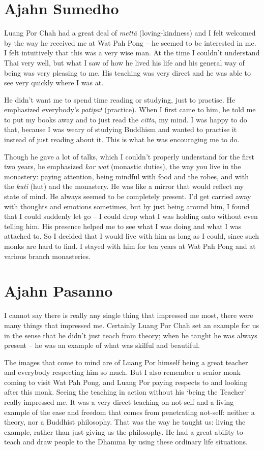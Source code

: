 
\section{Ajahn Sumedho}

Luang Por Chah had a great deal of \emph{mettā} (loving-kindness) and I
felt welcomed by the way he received me at Wat Pah Pong -- he seemed to
be interested in me. I felt intuitively that this was a very wise man. 
At the time I couldn't understand Thai very well, but what I saw of how
he lived his life and his general way of being was very pleasing to me. 
His teaching was very direct and he was able to see very quickly where I
was at. 

He didn't want me to spend time reading or studying, just to practise. 
He emphasized everybody's \emph{patipat} (practice). When I first came
to him, he told me to put my books away and to just read the
\emph{citta}, my mind. I was happy to do that, because I was weary of
studying Buddhism and wanted to practise it instead of just reading
about it. This is what he was encouraging me to do. 

Though he gave a lot of talks, which I couldn't properly understand for
the first two years, he emphasized \emph{kor wat} (monastic duties), the
way you live in the monastery: paying attention, being mindful with food
and the robes, and with the \emph{kuti} (hut) and the monastery. He was
like a mirror that would reflect my state of mind. He always seemed to
be completely present. I'd get carried away with thoughts and emotions
sometimes, but by just being around him, I found that I could suddenly
let go -- I could drop what I was holding onto without even telling him. 
His presence helped me to see what I was doing and what I was attached
to. So I decided that I would live with him as long as I could, since
such monks are hard to find. I stayed with him for ten years at Wat Pah
Pong and at various branch monasteries. 

\section{Ajahn Pasanno}

I cannot say there is really any single thing that impressed me most, 
there were many things that impressed me. Certainly Luang Por Chah set
an example for us in the sense that he didn't just teach from theory; 
when he taught he was always present -- he was an example of what was
skilful and beautiful. 

The images that come to mind are of Luang Por himself being a great
teacher and everybody respecting him so much. But I also remember a
senior monk coming to visit Wat Pah Pong, and Luang Por paying respects
to and looking after this monk. Seeing the teaching in action without
his `being the Teacher' really impressed me. It was a very direct
teaching on not-self and a living example of the ease and freedom that
comes from penetrating not-self: neither a theory, nor a Buddhist
philosophy. That was the way he taught us: living the example, rather
than just giving us the philosophy. He had a great ability to teach and
draw people to the Dhamma by using these ordinary life situations. 

